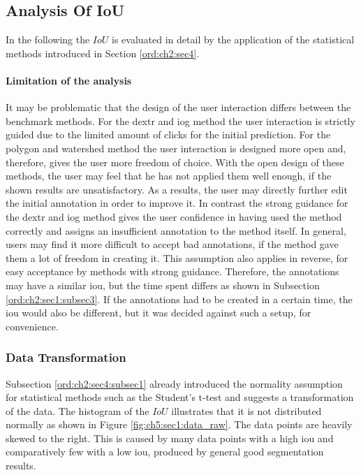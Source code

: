 \subsection{Analysis Of IoU}\label{ord:ch5:sec1:subsec2}

In the following the $IoU$ is evaluated in detail by the application of the statistical methods introduced in Section \ref{ord:ch2:sec4}.

\paragraph{Limitation of the analysis}
It may be problematic that the design of the user interaction differs between the benchmark methods.
For the \gls{dextr} and \gls{iog} method the user interaction is strictly guided due to the limited amount of clicks for the initial prediction.
For the polygon and watershed method the user interaction is designed more open and, therefore, gives the user more freedom of choice.
With the open design of these methods, the user may feel that he has not applied them well enough, if the shown results are unsatisfactory.
As a results, the user may directly further edit the initial annotation in order to improve it.
In contrast the strong guidance for the \gls{dextr} and \gls{iog} method gives the user confidence in having used the method correctly and assigns an insufficient annotation to the method itself.
In general, users may find it more difficult to accept bad annotations, if the method gave them a lot of freedom in creating it. 
This assumption also applies in reverse, for easy acceptance by methods with strong guidance.
Therefore, the annotations may have a similar \gls{iou}, but the time spent differs as shown in Subsection \ref{ord:ch2:sec1:subsec3}.
If the annotations had to be created in a certain time, the \gls{iou} would also be different, but it was decided against such a setup, for convenience.


\subsubsection{Data Transformation}
Subsection \ref{ord:ch2:sec4:subsec1} already introduced the normality assumption for statistical methods such as the Student's t-test and suggests a transformation of the data.
The histogram of the $IoU$ illustrates that it is not distributed normally as shown in Figure \ref{fig:ch5:sec1:data_raw}.
The data points are heavily skewed to the right. 
This is caused by many data points with a high \gls{iou} and comparatively few with a low \gls{iou}, produced by general good segmentation results.

